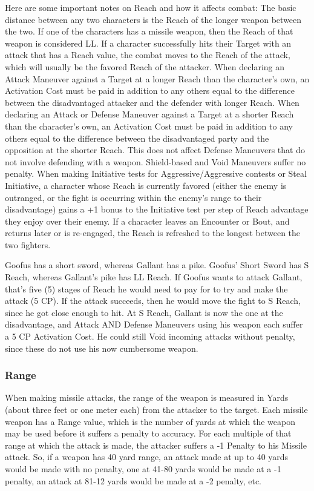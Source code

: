 \documentclass[oneside,11pt,english]{book}
\begin{document}
Here are some important notes on Reach and how it affects combat:
The basic distance between any two characters is the Reach of the longer weapon between the
two. If one of the characters has a missile weapon, then the Reach of that weapon is considered LL.
If a character successfully hits their Target with an attack that has a Reach value, the combat
moves to the Reach of the attack, which will usually be the favored Reach of the attacker.
When declaring an Attack Maneuver against a Target at a longer Reach than the character’s own,
an Activation Cost must be paid in addition to any others equal to the difference between the
disadvantaged attacker and the defender with longer Reach.
When declaring an Attack or Defense Maneuver against a Target at a shorter Reach than the
character’s own, an Activation Cost must be paid in addition to any others equal to the difference
between the disadvantaged party and the opposition at the shorter Reach. This does not affect
Defense Maneuvers that do not involve defending with a weapon. Shield-based and Void
Maneuvers suffer no penalty.
When making Initiative tests for Aggressive/Aggressive contests or Steal Initiative, a character
whose Reach is currently favored (either the enemy is outranged, or the fight is occurring within
the enemy’s range to their disadvantage) gains a +1 bonus to the Initiative test per step of Reach
advantage they enjoy over their enemy.
If a character leaves an Encounter or Bout, and returns later or is re-engaged, the Reach is
refreshed to the longest between the two fighters.

Goofus has a short sword, whereas Gallant has a pike. Goofus’ Short Sword has S Reach, whereas Gallant’s pike has LL Reach. 
If Goofus wants to attack Gallant, that’s five (5) stages of Reach he would need to pay for to try and make the attack (5 CP). If the attack succeeds, then he would move the fight to S Reach, since he got close enough to hit. At S Reach, Gallant is now the one at the disadvantage, and Attack AND Defense Maneuvers using his weapon each suffer a 5 CP Activation Cost. He could still Void incoming attacks without penalty, since these do not use his now cumbersome weapon.

\subsubsection{Range}
When making missile attacks, the range of the weapon is measured in Yards (about three feet or one
meter each) from the attacker to the target. Each missile weapon has a Range value, which is the number
of yards at which the weapon may be used before it suffers a penalty to accuracy. For each multiple of
that range at which the attack is made, the attacker suffers a -1 Penalty to his Missile attack. So, if a
weapon has 40 yard range, an attack made at up to 40 yards would be made with no penalty, one at 41-80
yards would be made at a -1 penalty, an attack at 81-12 yards would be made at a -2 penalty, etc.
\end{document}
